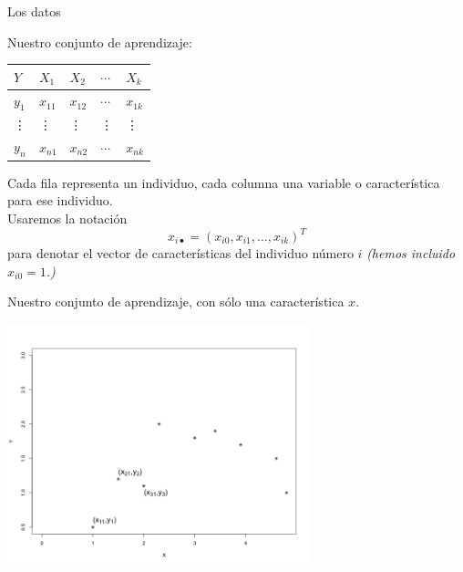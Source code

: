 \documentclass[aspectratio=169]{beamer}
\begin{document}
 \begin{frame}

   \begin{block}{Los datos}

      Nuestro conjunto de aprendizaje:\\
       \begin{center}
\begin{tabular}{lllll}
$Y$&$X_1$&$X_2$&$\cdots$&$X_k$\\ \hline
$y_1$&$x_{11}$&$x_{12}$&$\cdots$&$x_{1k}$\\
\vdots&\vdots&\vdots&\vdots&\vdots\\
$y_{n}$&$x_{n1}$&$x_{n2}$&$\cdots$&$x_{nk}$\\
\end{tabular}
\end{center}
Cada fila representa un individuo, cada columna una variable o característica para ese individuo.\\
 Usaremos la notación $$x_{i\bullet}=(x_{i0},x_{i1},\dots,x_{ik})^T$$ para denotar el vector de características del individuo número $i$ \textit{(hemos incluido $x_{i0}=1$.)}

   \end{block}
 \end{frame}
 \begin{frame}{Nuestro conjunto de aprendizaje, con sólo una
     característica $x$.}
\vspace{-0.5cm}
\begin{center}
    \includegraphics[height=7cm]{nube.png}
     \end{center}   
 \end{frame}
\end{document}
